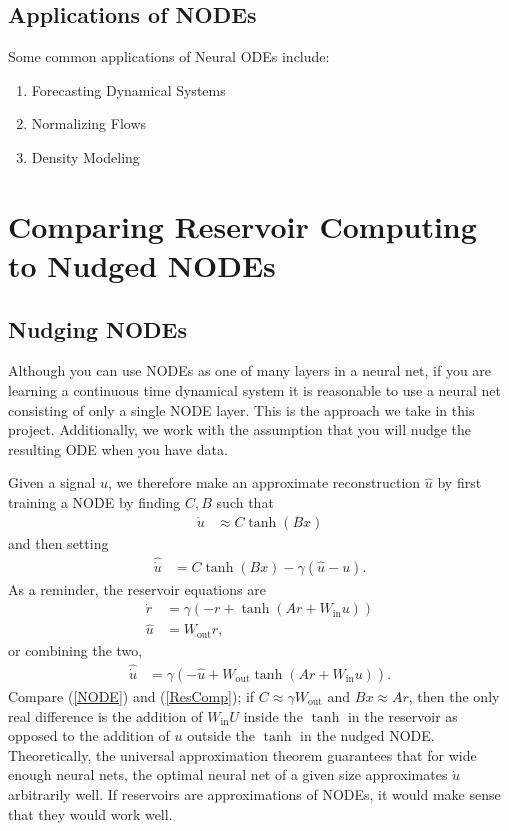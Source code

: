 \documentclass[12pt,oneside]{article}
\theoremstyle{plain}
\newcommand{\Wout}{W_{\text{out}}}
\newcommand{\Win}{W_{\text{in}}}%
\begin{document}
\subsection{Applications of NODEs}
Some common applications of Neural ODEs include:
\begin{enumerate}
    \item Forecasting Dynamical Systems

    \item Normalizing Flows

    \item Density Modeling
\end{enumerate}

\section{Comparing Reservoir Computing to Nudged NODEs}
\subsection{Nudging NODEs}
Although you can use NODEs as one of many layers in a neural net, if you are learning a continuous time dynamical system it is reasonable to use a neural net consisting of only a single NODE layer. This is the approach we take in this project. Additionally, we work with the assumption that you will nudge the resulting ODE when you have data.

Given a signal $u$, we therefore make an approximate reconstruction $\hat u$ by first training a NODE by finding $C, B$ such that
\begin{align*}
    \dot u &\approx C\tanh(Bx) 
\end{align*}
and then setting
\begin{align}
    \hat {\dot u} &=  C\tanh(Bx) - \gamma (\hat u - u). \label{NODE}
\end{align}
As a reminder, the reservoir equations are
\begin{align*}
    \dot r &= \gamma (-r + \tanh(Ar + \Win u))
    \\
    \hat u &= \Wout r,
\end{align*}
or combining the two, 
\begin{align}
    \hat {\dot u} &= \gamma (-\hat u + \Wout \tanh(Ar + \Win u)). \label{ResComp}
\end{align}
Compare (\ref{NODE}) and (\ref{ResComp}); if $C\approx \gamma \Wout$ and $Bx \approx Ar$, then the only real difference is the addition of $\Win U$ inside the $\tanh$ in the reservoir as opposed to the addition of $u$ outside the $\tanh$ in the nudged NODE. Theoretically, the universal approximation theorem guarantees that for wide enough neural nets, the optimal neural net of a given size approximates $\dot u$ arbitrarily well. If reservoirs are approximations of NODEs, it would make sense that they would work well.
\end{document}
